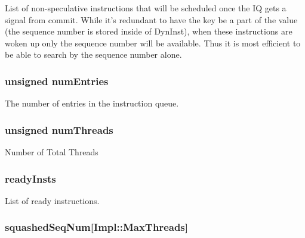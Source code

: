 \label{classInstQueue_ac0ba4d07026aaf6386c001a68d059cbf}
List of non-\/speculative instructions that will be scheduled once the IQ gets a signal from commit. While it's redundant to have the key be a part of the value (the sequence number is stored inside of DynInst), when these instructions are woken up only the sequence number will be available. Thus it is most efficient to be able to search by the sequence number alone. \hypertarget{classInstQueue_a325de474a9f6652329339d9fc2ea09c0}{
\subsubsection[{numEntries}]{\setlength{\rightskip}{0pt plus 5cm}unsigned {\bf numEntries}}}
\label{classInstQueue_a325de474a9f6652329339d9fc2ea09c0}
The number of entries in the instruction queue. \hypertarget{classInstQueue_a792311f13ea91008a88e902ef13b0341}{
\subsubsection[{numThreads}]{\setlength{\rightskip}{0pt plus 5cm}unsigned {\bf numThreads}}}
\label{classInstQueue_a792311f13ea91008a88e902ef13b0341}
Number of Total Threads \hypertarget{classInstQueue_a73e22f052c708ca5c198bd0a01eb3604}{
\subsubsection[{readyInsts}]{ {\bf readyInsts}}}
\label{classInstQueue_a73e22f052c708ca5c198bd0a01eb3604}
List of ready instructions. \hypertarget{classInstQueue_a97d5a7e4630ad1d017909f7504b9ec32}{
\subsubsection[{squashedSeqNum}]{ {\bf squashedSeqNum}\mbox{[}Impl::MaxThreads\mbox{]}}}
